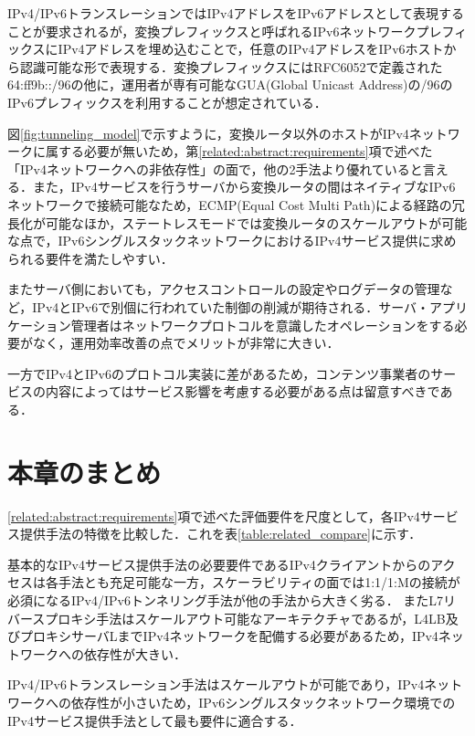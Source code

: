 IPv4/IPv6トランスレーションではIPv4アドレスをIPv6アドレスとして表現することが要求されるが，変換プレフィックスと呼ばれるIPv6ネットワークプレフィックスにIPv4アドレスを埋め込むことで，任意のIPv4アドレスをIPv6ホストから認識可能な形で表現する．変換プレフィックスにはRFC6052で定義された64:ff9b::/96の他に，運用者が専有可能なGUA(Global Unicast Address)の/96のIPv6プレフィックスを利用することが想定されている\cite{RFC6052}．

図\ref{fig:tunneling_model}で示すように，変換ルータ以外のホストがIPv4ネットワークに属する必要が無いため，第\ref{related:abstract:requirements}項で述べた「IPv4ネットワークへの非依存性」の面で，他の2手法より優れていると言える．また，IPv4サービスを行うサーバから変換ルータの間はネイティブなIPv6ネットワークで接続可能なため，ECMP(Equal Cost Multi Path)\cite{rfc2992}による経路の冗長化が可能なほか，ステートレスモードでは変換ルータのスケールアウトが可能な点で，IPv6シングルスタックネットワークにおけるIPv4サービス提供に求められる要件を満たしやすい．

またサーバ側においても，アクセスコントロールの設定やログデータの管理など，IPv4とIPv6で別個に行われていた制御の削減が期待される．サーバ・アプリケーション管理者はネットワークプロトコルを意識したオペレーションをする必要がなく，運用効率改善の点でメリットが非常に大きい．

一方でIPv4とIPv6のプロトコル実装に差があるため，コンテンツ事業者のサービスの内容によってはサービス影響を考慮する必要がある点は留意すべきである．


\section{本章のまとめ}
\ref{related:abstract:requirements}項で述べた評価要件を尺度として，各IPv4サービス提供手法の特徴を比較した．これを表\ref{table:related_compare}に示す．

基本的なIPv4サービス提供手法の必要要件であるIPv4クライアントからのアクセスは各手法とも充足可能な一方，スケーラビリティの面では1:1/1:Mの接続が必須になるIPv4/IPv6トンネリング手法が他の手法から大きく劣る．
またL7リバースプロキシ手法はスケールアウト可能なアーキテクチャであるが，L4LB及びプロキシサーバLまでIPv4ネットワークを配備する必要があるため，IPv4ネットワークへの依存性が大きい．

IPv4/IPv6トランスレーション手法はスケールアウトが可能であり，IPv4ネットワークへの依存性が小さいため，IPv6シングルスタックネットワーク環境でのIPv4サービス提供手法として最も要件に適合する．


